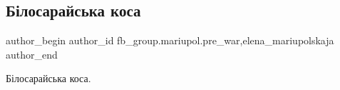  
 
 
 
 

\subsection{Білосарайська коса}
\label{sec:12_02_2023.fb.fb_group.mariupol.pre_war.9.b_losaraiska_kosa}
 
\ifcmt
 author_begin
   author_id fb_group.mariupol.pre_war,elena_mariupolskaja
 author_end
\fi

Білосарайська коса.

